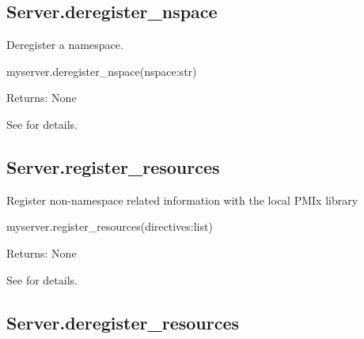 \subsection{Server.deregister_nspace}

\summary

Deregister a namespace.

\format

\pyspecificstart
\begin{codepar}
myserver.deregister_nspace(nspace:str)
\end{codepar}
\pyspecificend


\begin{arglist}
\end{arglist}

Returns: None

See  for details.


\subsection{Server.register_resources}

\summary

Register non-namespace related information with the local \ac{PMIx} library

\format

\pyspecificstart
\begin{codepar}
myserver.register_resources(directives:list)
\end{codepar}
\pyspecificend


\begin{arglist}
\end{arglist}

Returns: None

See  for details.


\subsection{Server.deregister_resources}

